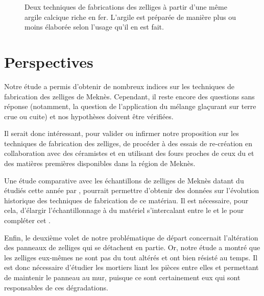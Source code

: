 \begin{figure}[p]
  \caption[Deux techniques de fabrications des zelliges à partir d'une 
           même argile calcique riche en fer]
          {Deux techniques de fabrications des zelliges à partir d'une 
           même argile calcique riche en fer. L'argile est préparée de 
           manière plus ou moins élaborée selon l'usage qu'il en est 
           fait.}
  \label{fig:protocole}
\end{figure}


\chapter{Perspectives}

Notre étude a permis d'obtenir de nombreux indices sur les techniques 
de fabrication des zelliges de Meknès. Cependant, il reste encore des 
questions sans réponse (notamment, la question de l'application du 
mélange glaçurant sur terre crue ou cuite) et nos hypothèses doivent 
être vérifiées.

Il serait donc intéressant, pour valider ou infirmer notre proposition 
sur les techniques de fabrication des zelliges, de procéder à des 
essais de re-création en collaboration avec des céramistes et en 
utilisant des fours proches de ceux du  et des matières 
premières disponibles dans la région de Meknès.

Une étude comparative avec les échantillons de zelliges de Meknès 
datant du  étudiés cette année par , 
pourrait permettre d'obtenir des données sur l'évolution historique 
des techniques de fabrication de ce matériau. Il est nécessaire, pour 
cela, d'élargir l'échantillonnage à du matériel s'intercalant entre 
le  et le  pour compléter cet 
.

Enfin, le deuxième volet de notre problématique de départ concernait 
l'altération des panneaux de zelliges qui se détachent en partie. Or, 
notre étude a montré que les zelliges eux-mêmes ne sont pas du tout 
altérés et ont bien résisté au temps. Il est donc nécessaire d'étudier 
les mortiers liant les pièces entre elles et permettant de maintenir 
le panneau au mur, puisque ce sont certainement eux qui sont 
responsables de ces dégradations.
